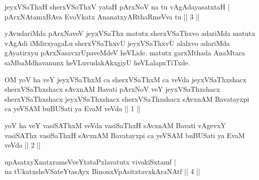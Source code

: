 \begin{shl}
\footnotemark[2]jeyxVSaThxH sherxVSoThxV yataH pArxNoV na tu vAgAdayasatxtaH | \\
pArxNAtamxBAva EvoVkatx AnanatxyARthaRmeVva tu \hfill|| 3 || 
\end{shl}

\begin{artha} 
yAvudariMda pArxNaveV jeyxVSaThx matutx sherxVSaThxvo adariMda matutx 
vAgAdi iMdirxyagaLu sherxVSaThxvU jeyxVSaThxvU alalxvo adariMda 
gAyatirxyu pArxNasavxrUpaveMdeV heVLide. matutx garxMthada AnaMtara 
saMbaMdhavanunx heVLuvudakAkxgiyU heVLalapxTiTxde.
\end{artha}

\begin{shl}
OM yoV ha veY jeyxVSaThxM ca sherxVSaThxM ca veVda jeyxVSaThxshacx sherxVSaThxshacx sAvxnAM Bavati pArxNoV veY jeyxVSaThxshacx sherxVSaThxshacx jeyxVSaThxshacx sherxVSaThxshacx sAvxnAM Bavatayxpi ca yeVSAM buBUSati ya EvaM veVda || 1 ||
\end{shl}

\begin{shl}
yoV ha veY vasiSAThxM veVda vasiSaThxH sAvxnAM Bavati vAgevxY vasiSAThx vasiSaThxH sAvxnAM Bavatayxpi ca yeVSAM buBUSati ya EvaM veVda || 2 ||
\end{shl}

\begin{shl}
upAsatxyXnatxrameVveYtataPxlavatutx vivakiSxtamf | \\
na tUkatxsheVSateYtasAyx BinonxVpAsitxtavxkAraNAtf \hfill|| 4 || 
\end{shl}

